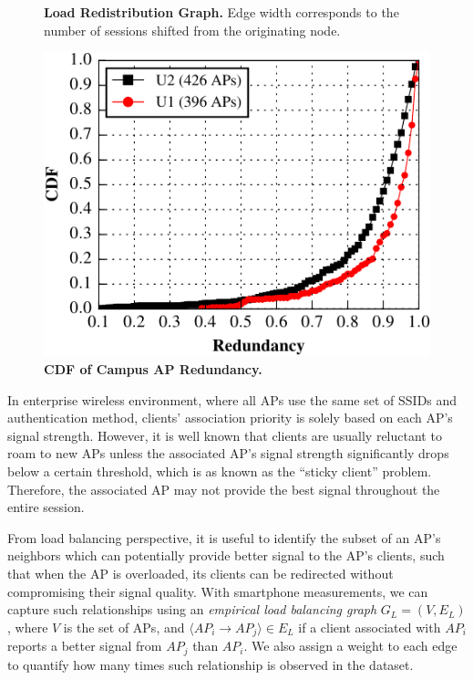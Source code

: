 \begin{figure}
\begin{minipage}[t]{0.31\textwidth}
    \caption{\textbf{Load Redistribution Graph.} Edge width corresponds to the
    number of \wifi{} sessions shifted from the originating node.}
    \label{fig:davis_load_redist}
  \end{minipage}\hspace{0.02\textwidth}%
  \begin{minipage}[t]{0.31\textwidth}
    \includegraphics[width=\textwidth]{./figures/CampusAPRedundancyFigure.pdf}
    \caption{\textbf{CDF of Campus AP Redundancy.}}
    \label{fig:ap_redundancy}
  \end{minipage}
  \vspace*{\aftercaptiongap}
\end{figure}

In enterprise wireless environment, where all APs use the same set of SSIDs and
authentication method, clients' association priority is solely based on each AP's
signal strength. However, it is well known that \wifi{} clients are usually
reluctant to roam to new APs unless the associated AP's signal strength
significantly drops below a certain threshold, which is as known as the ``sticky client''
problem. Therefore, the associated AP may not provide the best signal throughout
the entire \wifi{} session.

From load balancing perspective, it is useful to identify the subset of an AP's
neighbors which can potentially provide better signal to the AP's clients, such
that when the AP is overloaded, its clients can be redirected without
compromising their signal quality. With smartphone measurements, we can capture
such relationships using an \textit{empirical load balancing graph} $G_L = (V,
E_L)$, where $V$ is the set of APs, and $\langle AP_i \rightarrow AP_j \rangle
\in E_L$ if a client associated with $AP_i$ reports a better signal from $AP_j$
than $AP_i$. We also assign a weight to each edge to quantify how many times
such relationship is observed in the dataset.

